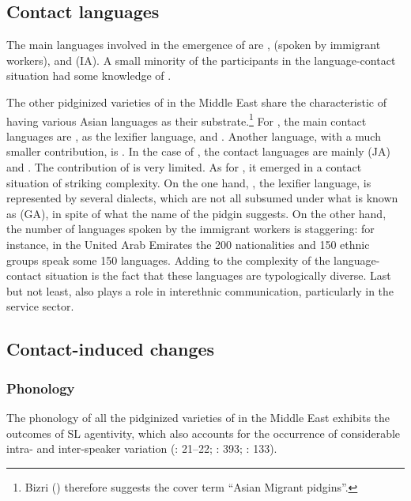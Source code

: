 \documentclass[output=paper]{langsci/langscibook}
\begin{document}
 
 \subsection{Contact languages}


The main languages involved in the emergence of   are ,  (spoken by immigrant workers), and   (IA). A small minority of the participants in the language-contact situation had some knowledge of .

The other pidginized varieties of  in the Middle East share the characteristic of having various Asian languages as their {substrate}.\footnote{Bizri (\citeyear[385]{Bizri2014}) therefore suggests the cover term “Asian Migrant  pidgins”.} For , the main contact languages are  , as the {lexifier} language, and . Another language, with a much smaller contribution, is . In the case of  , the contact languages are mainly   (JA) and . The contribution of  is very limited. As for , it emerged in a contact situation of striking complexity. On the one hand, , the {lexifier} language, is represented by several dialects, which are not all subsumed under what is known as   (GA), in spite of what the name of the {pidgin} suggests. On the other hand, the number of languages spoken by the immigrant workers is staggering: for instance, in the United Arab Emirates the 200 nationalities and 150 ethnic groups speak some 150 languages. Adding to the complexity of the language-contact situation is the fact that these languages are typologically diverse. Last but not least,  also plays a role in interethnic communication, particularly in the service sector.


 
 \subsection{Contact-induced changes}
 \subsubsection{Phonology}

The phonology of all the pidginized varieties of  in the Middle East exhibits the outcomes of {SL} agentivity, which also accounts for the occurrence of considerable intra- and  inter-speaker variation (\citealt{Avram2010}: 21–22; \citealt{Bizri2014}: 393; \citealt{Avram2017article}: 133).
\end{document}
